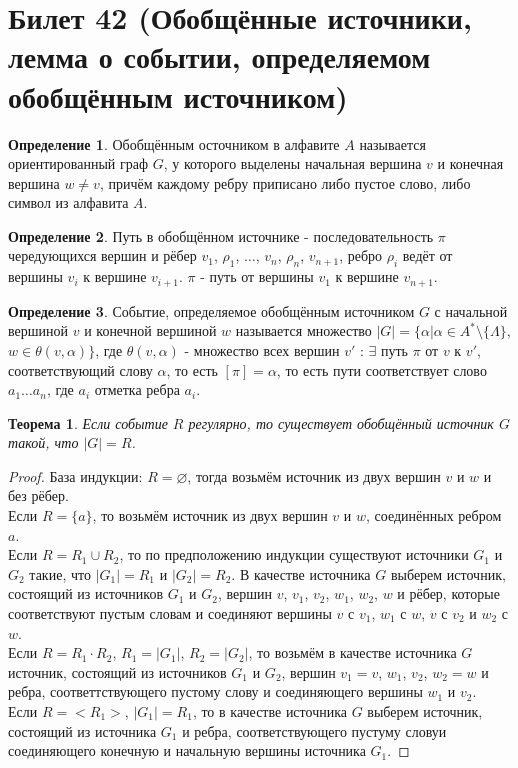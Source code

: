 \documentclass[a4paper, 12pt]{article}
\theoremstyle{definition}
\newtheorem*{definition}{Определение}
\theoremstyle{plain}
\newtheorem*{theorem}{Теорема}
\theoremstyle{remark}
\begin{document}
  \section{Билет 42 (Обобщённые источники, лемма о событии, определяемом обобщённым источником)}
  \begin{definition}
    Обобщённым осточником в алфавите $A$ называется ориентированный граф $G$, у которого выделены начальная вершина $v$ и конечная вершина $w\neq v$, причём каждому ребру приписано либо пустое слово, либо символ из алфавита $A$.
  \end{definition}
  \begin{definition}
    Путь в обобщённом источнике - последовательность $\pi$ чередующихся вершин и рёбер $v_1$, $\rho_1$, $\ldots$, $v_n$, $\rho_n$, $v_{n+1}$, ребро $\rho_i$ ведёт от вершины $v_i$ к вершине $v_{i+1}$. $\pi$ - путь от вершины $v_1$ к вершине $v_{n+1}$.
  \end{definition}
  \begin{definition}
    Событие, определяемое обобщённым источником $G$ с начальной вершиной $v$ и конечной вершиной $w$ называется множество $|G|=\{\alpha|\alpha\in A^*\setminus\{\Lambda\}$, $w\in \theta(v,\alpha)\}$, где $\theta(v,\alpha)$ - множество всех вершин $v'$ : $\exists$ путь $\pi$ от $v$ к $v'$, соответствующий слову $\alpha$, то есть $[\pi]=\alpha$, то есть пути соответствует слово $a_1\ldots a_n$, где $a_i$ отметка ребра $a_i$.
  \end{definition}
  \begin{theorem}
    Если событие $R$ регулярно, то существует обобщённый источник $G$ такой, что $|G|=R$.
  \end{theorem}
  \begin{proof}
    База индукции: $R=\varnothing$, тогда возьмём источник из двух вершин $v$ и $w$ и без рёбер.\\
    Если $R=\{a\}$, то возьмём источник из двух вершин $v$ и $w$, соединённых ребром $a$.\\
    Если $R=R_1\cup R_2$, то по предположению индукции существуют источники $G_1$ и $G_2$ такие, что $|G_1|=R_1$ и $|G_2|=R_2$. В качестве источника $G$ выберем источник, состоящий из источников $G_1$ и $G_2$, вершин $v$, $v_1$, $v_2$, $w_1$, $w_2$, $w$ и рёбер, которые соответствуют пустым словам и соединяют вершины $v$ с $v_1$, $w_1$ с $w$, $v$ с $v_2$ и $w_2$ с $w$.\\
    Если $R=R_1\cdot R_2$, $R_1=|G_1|$, $R_2=|G_2|$, то возьмём в качестве источника $G$ источник, состоящий из источников $G_1$ и $G_2$, вершин $v_1=v$, $w_1$, $v_2$, $w_2=w$ и ребра, соответтствующего пустому слову и соединяющего вершины $w_1$ и $v_2$.\\
    Если $R=<R_1>$, $|G_1|=R_1$, то в качестве источника $G$ выберем источник, состоящий из источника $G_1$ и  ребра, соответствующего пустуму словуи соединяющего конечную и начальную вершины источника $G_1$.
  \end{proof}
\end{document}
